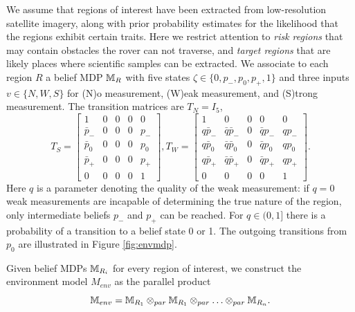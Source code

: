 \documentclass[conference]{IEEEtran}
\begin{document}
We assume that regions of interest have been extracted from low-resolution satellite imagery, along with prior probability estimates for the likelihood that the regions exhibit certain traits. Here we restrict attention to \emph{risk regions} that may contain obstacles the rover can not traverse, and \emph{target regions} that are likely places where scientific samples can be extracted. We associate to each region $R$ a belief MDP $\mathbb{M}_{R}$ with five states $\zeta \in \{ 0, p_-, p_0, p_+, 1\}$ and three inputs $v \in \{ N, W, S \}$ for (N)o measurement, (W)eak measurement, and (S)trong measurement. The transition matrices are $T_N = I_5$, 
\begin{equation}
  T_{S} = \left[\begin{smallmatrix}
    1        &  0  &  0  &  0  &  0   \\
    \bar p_- &  0  &  0  &  0  &  p_- \\
    \bar p_0 &  0  &  0  &  0  &  p_0 \\
    \bar p_+ &  0  &  0  &  0  &  p_+ \\
    0        &  0  &  0  &  0  &  1
  \end{smallmatrix}\right],
  T_{W} = \left[\begin{smallmatrix}
    1        &  0                &  0  &  0           &  0   \\
    q\bar p_-&  \bar q \bar p_-  &  0  &  \bar q p_-  &  q p_- \\
    q\bar p_0&  \bar q \bar p_0  &  0  &  \bar q p_0  &  q p_0 \\
    q\bar p_+&  \bar q \bar p_+  &  0  &  \bar q p_+  &  q p_+ \\
    0        &  0  &  0  &  0  &  1
  \end{smallmatrix}\right].
\end{equation}
Here $q$ is a parameter denoting the quality of the weak measurement: if $q=0$ weak measurements are incapable of determining the true nature of the region, only intermediate beliefs $p_-$ and $p_+$ can be reached. For $q \in (0,1]$ there is a probability of a transition to a belief state 0 or 1. The outgoing transitions from $p_0$ are illustrated in Figure \ref{fig:envmdp}.

Given belief MDPs $\mathbb{M}_{R_i}$ for every region of interest, we construct the environment model $M_{env}$ as the parallel product
\begin{equation}
  \mathbb{M}_{env} = \mathbb{M}_{R_1} \otimes_{par} \mathbb{M}_{R_1}  \otimes_{par} \ldots \otimes_{par} \mathbb{M}_{R_n}. 
\end{equation}
\end{document}
